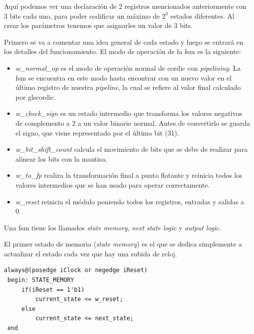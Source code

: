 Aquí podemos ver una declaración de 2 registros mencionados anteriormente con 3 bits cada uno, para poder codificar un máximo de $2^3$ estados diferentes. Al crear los parámetros tenemos que asignarles un valor de 3 bits.

Primero se va a comentar una idea general de cada estado y luego se entrará en los detalles del funcionamiento. El modo de operación de la \gls{fsm} es la siguiente:

\begin{itemize}
	\item \textit{w\_normal\_op} es el modo de operación normal de \gls{cordic} con \textit{pipelining}. La \gls{fsm} se encuentra en este modo hasta encontrar con un nuevo valor en el último registro de nuestra \textit{pipeline}, la cual se refiere al valor final calculado por gls{cordic}.
	
	\item \textit{w\_check\_sign} es un estado intermedio que transforma los valores negativos de complemento a 2 a un valor binario normal. Antes de convertirlo se guarda el signo, que viene representado por el último bit (31).
	
	\item \textit{w\_bit\_shift\_count} calcula el movimiento de bits que se debe de realizar para alinear los bits con la mantisa.
	
	\item \textit{w\_to\_fp} realiza la transformación final a punto flotante y reinicia todos los valores intermedios que se han usado para operar correctamente.
	
	\item \textit{w\_reset} reinicia el módulo poniendo todos los registros, entradas y salidas a 0.
	
\end{itemize}

Una \gls{fsm} tiene los llamados \textit{state memory}, \textit{next state logic} y \textit{output logic}.

El primer estado de memoria (\textit{state memory}) es el que se dedica simplemente a actualizar el estado cada vez que hay una subida de reloj.

\begin{lstlisting}[caption={\textit{state memory} de \gls{cordic}}]
always@(posedge iClock or negedge iReset)
 begin: STATE_MEMORY
     if(iReset == 1'b1)
         current_state <= w_reset;
     else
         current_state <= next_state;
 end
\end{lstlisting}

